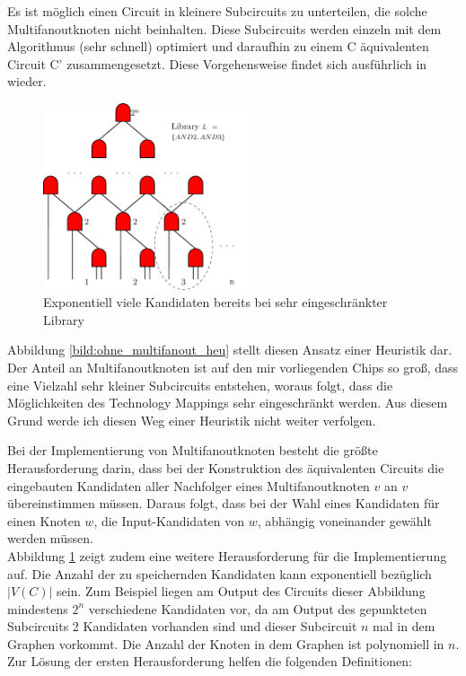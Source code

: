 \documentclass[11pt, a4paper, german]{article}
\begin{document}
Es ist möglich einen Circuit in kleinere Subcircuits zu unterteilen, die solche Multifanoutknoten nicht beinhalten. Diese Subcircuits werden einzeln mit dem Algorithmus (sehr schnell) optimiert und daraufhin zu einem C äquivalenten Circuit C' zusammengesetzt. Diese Vorgehensweise findet sich ausführlich in \cite{DAGON} wieder. 
   \begin{figure}%
\includegraphics[width= 6cm]{pictures/compiled/expo_kand}
\caption{Exponentiell viele Kandidaten bereits bei sehr eingeschränkter Library}
\label{bild:expo_kan}
\end{figure}
Abbildung \ref{bild:ohne_multifanout_heu} stellt diesen Ansatz einer Heuristik dar. \\
 Der Anteil an Multifanoutknoten ist auf den mir vorliegenden Chips so groß, dass eine Vielzahl sehr kleiner Subcircuits entstehen, woraus folgt, dass die Möglichkeiten des Technology Mappings sehr eingeschränkt werden. 
Aus diesem Grund werde ich diesen Weg einer Heuristik nicht weiter verfolgen.

Bei der Implementierung von Multifanoutknoten besteht die größte Herausforderung darin, dass bei der Konstruktion des äquivalenten Circuits die eingebauten Kandidaten aller Nachfolger eines Multifanoutknoten $v$ an $v$ übereinstimmen müssen. Daraus folgt, dass bei der Wahl eines Kandidaten für einen Knoten $w$, die  Input-Kandidaten von $w$, abhängig voneinander gewählt werden müssen. \\

Abbildung \ref{bild:expo_kan} zeigt zudem eine weitere Herausforderung für die Implementierung auf. Die Anzahl der zu speichernden Kandidaten kann  exponentiell bezüglich $|V(C)|$ sein. Zum Beispiel liegen am Output des Circuits dieser Abbildung mindestens $2^n$ verschiedene Kandidaten vor, da am Output des gepunkteten Subcircuits  2 Kandidaten vorhanden sind und dieser Subcircuit $n$ mal in dem Graphen vorkommt. Die Anzahl der Knoten in dem Graphen ist polynomiell in $n$.  \\
Zur Lösung der ersten Herausforderung helfen die folgenden Definitionen:\\
\end{document}
